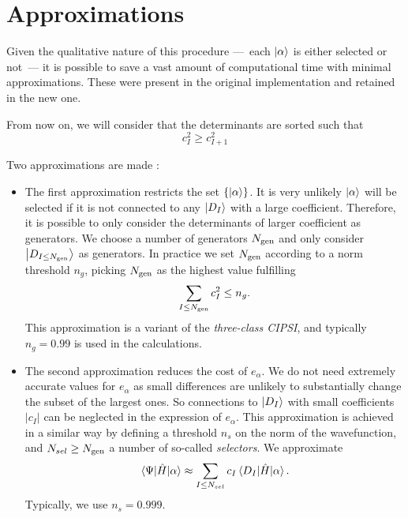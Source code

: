 \documentclass[./thesis.tex]{subfiles}
\begin{document}
\section{Approximations}
\label{sec:cipsi_approx}

Given the qualitative nature of this procedure ---~each ${\ket{\alpha}}$ is either selected or not~--- it is possible to save a vast amount of computational time with minimal approximations. These were present in the original implementation and retained in the new one.

From now on, we will consider that the determinants are sorted such that 
\begin{equation}
c^2_{I} \ge c_{I+1}^2
\end{equation}

Two approximations are made :

\begin{itemize}
\item
The first approximation restricts the set $\{{\ket{\alpha}}\}$. It is very unlikely $\ket \alpha$ will be selected if it is not connected to any ${\ket{D_I}}$ with a large coefficient. Therefore, it is possible to only consider the determinants of larger coefficient as generators. We choose a number of generators ${N_\text{gen}}$ and only consider $\ket{D_{I \leq {N_\text{gen}}}}$ as generators. In practice we set ${N_\text{gen}}$ according to a norm threshold $n_g$, picking ${N_\text{gen}}$ as the highest value fulfilling
\begin{equation}
\sum_{I \leq {N_\text{gen}}} c_I^2 \leq n_g.
\end{equation}
This approximation is a variant of the \emph{three-class CIPSI},\cite{Evangelisti_1983}
and typically $n_g=0.99$ is used in the calculations.
\item The second approximation reduces the cost of $e_\alpha$.
We do not need extremely accurate values for $e_\alpha$ as small differences are unlikely to substantially change the subset of the largest ones.
So  connections to $\ket {D_I}$ with small coefficients $|c_I|$ can be neglected
in the expression of $e_\alpha$.
This approximation is achieved in a similar way by defining a threshold $n_s$
on the norm of the wavefunction, and $N_{sel} \geq {N_\text{gen}}$ a number of so-called
\emph{selectors}. We approximate 
\begin{equation}
  \mel{\Psi}{\hat{H}}{\alpha} \approx \sum_{I \leq N_{sel}} c_I \mel{D_I}{\hat{H}}{\alpha}.
\end{equation}
Typically, we use $n_s = 0.999$.

\end{itemize}
\end{document}
